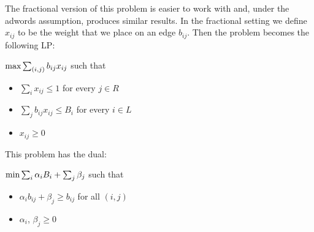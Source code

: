 \documentclass{amsart}
\theoremstyle{definition}
\theoremstyle{remark}
\begin{document}
The fractional version of this problem is easier to work with and, under the adwords assumption, produces similar results.  In the fractional setting we define $x_{ij}$ to be the weight that we place on an edge $b_{ij}$.  Then the problem becomes the following LP:

$\textup{max} \sum_{(i,j)} b_{ij}x_{ij}$ such that 
\begin{itemize}
\item $\sum_{i} x_{ij} \leq 1$ for every $j \in R$
\item $\sum_{j} b_{ij}x_{ij} \leq B_i$ for every $i \in L$
\item $x_{ij} \geq 0$
\end{itemize}

This problem has the dual:

$\textup{min} \sum_i \alpha_i B_i + \sum_j \beta_j$ such that
\begin{itemize}
\item $\alpha_i b_{ij} + \beta_j \geq b_{ij}$ for all $(i,j)$
\item $\alpha_i$, $\beta_j \geq 0$
\end{itemize}
\end{document}
